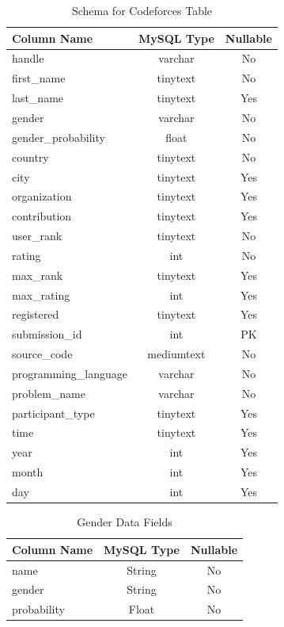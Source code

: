 \documentclass{article}
\begin{document}
\begin{table}[t]
    \begin{center}
        \caption{Schema for Codeforces Table}
        \label{tab:cf_data}
        \begin{tabular}{|l | c | c |}
            \hline
            \textbf{Column Name} & \textbf{MySQL Type} & \textbf{Nullable}\\
            \hline
            handle & varchar & No\\
            first{\_}name & tinytext & No\\
            last{\_}name & tinytext & Yes\\
            gender & varchar & No\\
            gender{\_}probability & float & No\\
            country & tinytext & No\\
            city & tinytext & Yes\\
            organization & tinytext & Yes\\
            contribution & tinytext & Yes\\
            user{\_}rank & tinytext & No\\
            rating & int & No\\
            max{\_}rank & tinytext & Yes\\
            max{\_}rating & int & Yes\\
            registered & tinytext & Yes\\
            \hline
            submission{\_}id & int & PK\\
            source{\_}code & mediumtext & No\\
            programming{\_}language & varchar & No\\
            problem{\_}name & varchar & No\\
            participant{\_}type & tinytext & Yes\\
            time & tinytext & Yes\\
            year & int & Yes\\
            month & int & Yes\\
            day & int & Yes\\
            \hline
        \end{tabular}
    \end{center}
\end{table}

\begin{table}
    \begin{center}
        \caption{Gender Data Fields}
        \label{tab:gen_data}
        \begin{tabular}{| l |c | c |}
            \hline
            \textbf{Column Name} & \textbf{MySQL Type} & \textbf{Nullable}\\
            \hline
            name & String & No\\
            gender & String & No\\
            probability & Float & No\\
            \hline
        \end{tabular}
    \end{center}
\end{table}
\end{document}
